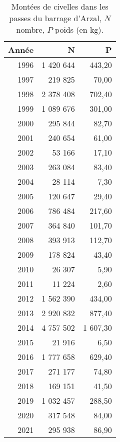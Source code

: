 \begin{table}[htbp]
\centering
\begin{tabular}{rrr}
  \hline
Année & N & P \\ 
  \hline
1996 & 1 420 644 & 443,20 \\ 
  1997 & 219 825 & 70,00 \\ 
  1998 & 2 378 408 & 702,40 \\ 
  1999 & 1 089 676 & 301,00 \\ 
  2000 & 295 844 & 82,70 \\ 
  2001 & 240 654 & 61,00 \\ 
  2002 & 53 166 & 17,10 \\ 
  2003 & 263 084 & 83,40 \\ 
  2004 & 28 114 & 7,30 \\ 
  2005 & 120 647 & 29,40 \\ 
  2006 & 786 484 & 217,60 \\ 
  2007 & 364 840 & 101,70 \\ 
  2008 & 393 913 & 112,70 \\ 
  2009 & 178 824 & 43,40 \\ 
  2010 & 26 307 & 5,90 \\ 
  2011 & 11 224 & 2,60 \\ 
  2012 & 1 562 390 & 434,00 \\ 
  2013 & 2 920 832 & 877,40 \\ 
  2014 & 4 757 502 & 1 607,30 \\ 
  2015 & 21 916 & 6,50 \\ 
  2016 & 1 777 658 & 629,40 \\ 
  2017 & 271 177 & 74,80 \\ 
  2018 & 169 151 & 41,50 \\ 
  2019 & 1 032 457 & 288,50 \\ 
  2020 & 317 548 & 84,00 \\ 
  2021 & 295 938 & 86,90 \\ 
   \hline
\end{tabular}
\caption{Montées de civelles dans les passes du barrage d'Arzal, $N$ nombre,
		$P$ poids (en kg).} 
\label{table_civelle}
\end{table}
